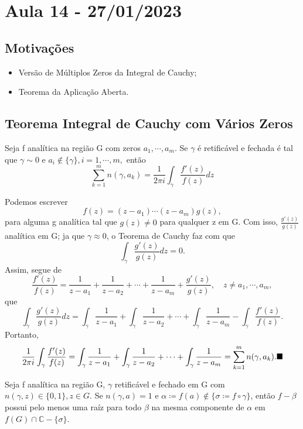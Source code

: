 \documentclass[complex.tex]{subfiles}
\begin{document}
\section{Aula 14 - 27/01/2023}
\subsection{Motivações}
\begin{itemize}
	\item Versão de Múltiplos Zeros da Integral de Cauchy;
	\item Teorema da Aplicação Aberta.
\end{itemize}

\subsection{Teorema Integral de Cauchy com Vários Zeros}
\hypertarget{zeros_cauchy}{\begin{theorem*}
		Seja f analítica na região G com zeros $a_{1}, \cdots, a_{m}.$ Se $\gamma$ é retificável e fechada é tal que $\gamma\sim0$
		e $a_{i}\not\in \{\gamma\}, i = 1, \cdots, m, $ então
		$$
			\sum\limits_{k=1}^{m}n(\gamma, a_{k}) = \frac{1}{2\pi i}\int_{\gamma}^{}\frac{f'(z)}{f(z)}dz
		$$
	\end{theorem*}}
\begin{proof*}
	Podemos escrever
	$$
		f(z) = (z-a_{1})\cdots(z-a_{m})g(z),
	$$
	para alguma g analítica tal que $g(z)\neq0$ para qualquer z em G. Com isso, $\displaystyle \frac{g'(z)}{g(z)}$ analítica em G;
	ja que $\gamma\approx0$, o Teorema de Cauchy faz com que
	$$
		\int_{\gamma}^{}\frac{g'(z)}{g(z)}dz = 0.
	$$
	Assim, segue de
	$$
		\frac{f'(z)}{f(z)} = \frac{1}{z-a_{1}} + \frac{1}{z-a_{2}} + \cdots + \frac{1}{z-a_{m}} + \frac{g'(z)}{g(z)},\quad z\neq a_{1}, \cdots, a_{m},
	$$
	que
	$$
		\int_{\gamma}^{}\frac{g'(z)}{g(z)}dz = \int_{\gamma}^{}\frac{1}{z-a_{1}} + \int_{\gamma}^{}\frac{1}{z-a_{2}} + \cdots + \int_{\gamma}^{}\frac{1}{z-a_{m}} - \int_{\gamma}^{}\frac{f'(z)}{f(z)}.
	$$
	Portanto,
	$$
		\frac{1}{2\pi i}\int_{\gamma}^{}\frac{f'(z)}{f(z)} = \int_{\gamma}^{}\frac{1}{z-a_{1}} + \int_{\gamma}^{}\frac{1}{z-a_{2}} + \cdots + \int_{\gamma}^{}\frac{1}{z-a_{m}} = \sum\limits_{k=1}^{m}n(\gamma, a_{k}).\text{$\blacksquare$}
	$$
\end{proof*}
\begin{prop*}
	Seja f analítica na região G, $\gamma$ retificável e fechado em G com $n(\gamma, z)\in \{0, 1\}, z\in{G}.$ Se $n(\gamma, a) = 1$
	e $\alpha\coloneqq  f(a)\not\in \{\sigma\coloneqq  f\circ{\gamma}\} $, então $f-\beta$ possui pelo menos uma raíz para todo $\beta$ na mesma componente
	de $\alpha$ em $f(G)\cap{\mathbb{C}-\{\sigma\}}$.
\end{prop*}
\end{document}
